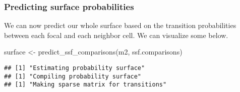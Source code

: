 \documentclass[
]{article}
\newenvironment{Shaded}{\begin{snugshade}}{\end{snugshade}}
\newcommand{\FunctionTok}[1]{\textcolor[rgb]{0.00,0.00,0.00}{#1}}
\newcommand{\NormalTok}[1]{#1}
\newcommand{\OtherTok}[1]{\textcolor[rgb]{0.56,0.35,0.01}{#1}}
\begin{document}
\hypertarget{predicting-surface-probabilities}{%
\subsubsection{Predicting surface
probabilities}\label{predicting-surface-probabilities}}

We can now predict our whole surface based on the transition
probabilities between each focal and each neighbor cell. We can
visualize some below.

\begin{Shaded}
\begin{Highlighting}[]
\NormalTok{surface }\OtherTok{\textless{}{-}} \FunctionTok{predict\_ssf\_comparisons}\NormalTok{(m2, ssf.comparisons)}
\end{Highlighting}
\end{Shaded}

\begin{verbatim}
## [1] "Estimating probability surface"
## [1] "Compiling probability surface"
## [1] "Making sparse matrix for transitions"
\end{verbatim}
\end{document}
